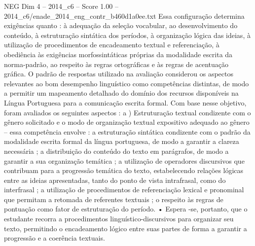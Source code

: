 \begin{textsample}{NEG Dim 4 – 2014\_c6 – Score 1.00 – 2014\_c6/enade\_2014\_eng\_contr\_b460d1a0ee.txt}
Essa configuração determina exigências quanto : à adequação da seleção vocabular, ao desenvolvimento do conteúdo, à estruturação sintática dos períodos, à organização lógica das ideias, à utilização de procedimentos de encadeamento textual e referenciação, à obediência às exigências morfossintáticas próprias da modalidade escrita da norma-padrão, ao respeito às regras ortográficas e às regras de acentuação gráfica.
O padrão de respostas utilizado na avaliação considerou os aspectos relevantes ao bom desempenho linguístico como competências distintas, de modo a permitir um mapeamento detalhado do domínio dos recursos disponíveis na Língua Portuguesa para a comunicação escrita formal.
Com base nesse objetivo, foram avaliados os seguintes aspectos : a ) Estruturação textual condizente com o gênero solicitado e o modo de organização textual expositivo adequado ao gênero – essa competência envolve : a estruturação sintática condizente com o padrão da modalidade escrita formal da língua portuguesa, de modo a garantir a clareza necessária ; a distribuição do conteúdo do texto em parágrafos, de modo a garantir a sua organização temática ; a utilização de operadores discursivos que contribuam para a progressão temática do texto, estabelecendo relações lógicas entre as ideias apresentadas, tanto do ponto de vista intrafrasal, como do interfrasal ; a utilização de procedimentos de referenciação lexical e pronominal que permitam a retomada de referentes textuais ; o respeito às regras de pontuação como fator de estruturação do período. • Espera -se, portanto, que o estudante recorra a procedimentos linguístico-discursivos para organizar seu texto, permitindo o encadeamento lógico entre suas partes de forma a garantir a progressão e a coerência textuais.

\end{textsample}
